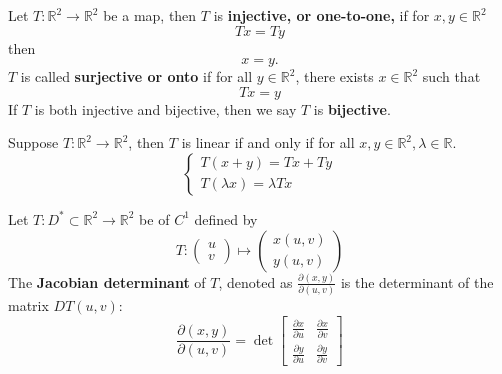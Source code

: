 \documentclass[openany]{book}
\newcommand{\R}{\mathbb{R}}
\begin{document}
\begin{defn}
    Let $T:\R^2\to\R^2$ be a map, then $T$ is \textbf{injective, or one-to-one,} if for $x,y\in\R^2$
    \begin{equation*}
        Tx=Ty
    \end{equation*}
    then
    \begin{equation*}
        x=y.
    \end{equation*}
    $T$ is called \textbf{surjective or onto} if for all $y\in\R^2$, there exists $x\in\R^2$ such that 
    \begin{equation*}
        Tx=y
    \end{equation*}
    If $T$ is both injective and bijective, then we say $T$ is \textbf{bijective}.
\end{defn}

\begin{defn}
    Suppose $T:\R^2\to\R^2$, then $T$ is linear if and only if for all $x,y\in\R^2, \lambda\in\R$.
    \begin{equation*}
        \begin{cases}
            T(x+y)=Tx+Ty\\
            T(\lambda x)=\lambda Tx
        \end{cases}
    \end{equation*}
\end{defn}


\begin{defn}
    Let $T:D^*\subset\R^2\to\R^2$ be of $C^1$ defined by 
    \begin{equation*}
        T:\begin{pmatrix}
            u\\
            v
        \end{pmatrix}\mapsto \begin{pmatrix}
            x(u,v)\\
            y(u,v)
        \end{pmatrix}
    \end{equation*}
    The \textbf{Jacobian determinant} of $T$, denoted as $\frac{\partial(x,y)}{\partial(u,v)}$ is the determinant of the matrix $DT(u,v)$:
    \begin{equation*}
        \frac{\partial(x,y)}{\partial(u,v)}=\det\begin{bmatrix}
            \frac{\partial x}{\partial u}& \frac{\partial x}{\partial v}\\
            \frac{\partial y}{\partial u}&\frac{\partial y}{\partial v}
        \end{bmatrix}
    \end{equation*}
\end{defn}
\end{document}
